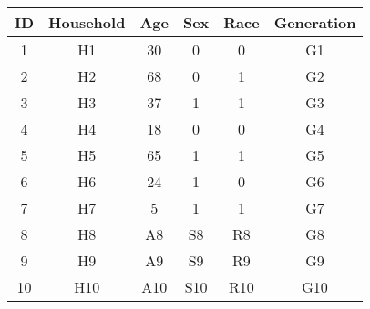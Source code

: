 \begin{tabular}{cccccc}
ID & Household & Age & Sex & Race & Generation \\
\hline
\hline
1 & H1 & 30 & 0 & 0 & G1  \\
\hline
2 & H2 & 68 & 0 & 1 & G2  \\
\hline
3 & H3 & 37 & 1 & 1 & G3  \\
\hline
4 & H4 & 18 & 0 & 0 & G4  \\
\hline
5 & H5 & 65 & 1 & 1 & G5  \\
\hline
6 & H6 & 24 & 1 & 0 & G6  \\
\hline
7 & H7 & 5 & 1 & 1 & G7  \\
\hline
8 & H8 & A8 & S8 & R8 & G8  \\
\hline
9 & H9 & A9 & S9 & R9 & G9  \\
\hline
10 & H10 & A10 & S10 & R10 & G10  \\
\hline
\end{tabular}
